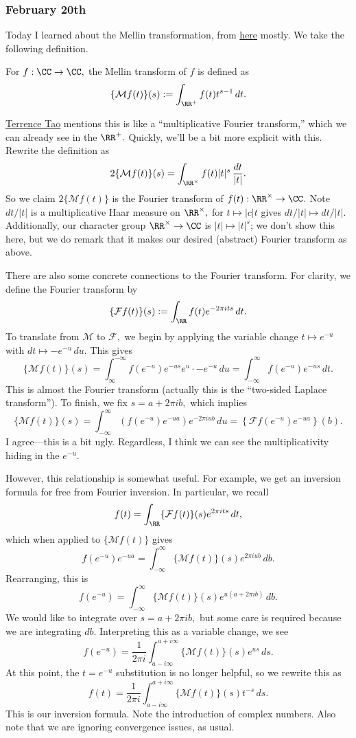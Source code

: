 \subsubsection{February 20th}
Today I learned about the Mellin transformation, from \href{http://dsp-book.narod.ru/TAH/ch11.pdf}{here} mostly. We take the following definition.
\begin{definition}
    For $f:\CC\to\CC,$ the Mellin transform of $f$ is defined as
    \[\{\mathcal Mf(t)\}(s):=\int_{\RR^+}f(t)t^{s-1}\,dt.\]
\end{definition}
\href{https://terrytao.wordpress.com/2008/07/27/tates-proof-of-the-functional-equation/}{Terrence Tao} mentions this is like a ``multiplicative Fourier transform,'' which we can already see in the $\RR^+.$ Quickly, we'll be a bit more explicit with this. Rewrite the definition as
\[2\{\mathcal Mf(t)\}(s)=\int_{\RR^\times}f(t)|t|^s\,\frac{dt}{|t|}.\]
So we claim $2\{\mathcal Mf(t)\}$ is the Fourier transform of $f(t):\RR^\times\to\CC.$ Note $dt/|t|$ is a multiplicative Haar measure on $\RR^\times,$ for $t\mapsto|c|t$ gives $dt/|t|\mapsto dt/|t|.$ Additionally, our character group $\RR^\times\to\CC$ is $|t|\mapsto |t|^s$; we don't show this here, but we do remark that it makes our desired (abstract) Fourier transform as above.

There are also some concrete connections to the Fourier transform. For clarity, we define the Fourier transform by
\[\{\mathcal Ff(t)\}(s):=\int_\RR f(t)e^{-2\pi its}\,dt.\]
To translate from $\mathcal M$ to $\mathcal F,$ we begin by applying the variable change $t\mapsto e^{-u}$ with $dt\mapsto-e^{-u}\,du.$ This gives
\[\{\mathcal Mf(t)\}(s)=\int_\infty^{-\infty}f\left(e^{-u}\right)e^{-us}e^u\cdot-e^{-u}\,du=\int_{-\infty}^\infty f\left(e^{-u}\right)e^{-us}\,dt.\]
This is almost the Fourier transform (actually this is the ``two-sided Laplace transform''). To finish, we fix $s=a+2\pi ib,$ which implies
\[\{\mathcal Mf(t)\}(s)=\int_{-\infty}^\infty\left(f\left(e^{-u}\right)e^{-ua}\right)e^{-2\pi iub}\,du=\left\{\mathcal Ff\left(e^{-u}\right)e^{-ua}\right\}(b).\]
I agree---this is a bit ugly. Regardless, I think we can see the multiplicativity hiding in the $e^{-u}.$

However, this relationship is somewhat useful. For example, we get an inversion formula for free from Fourier inversion. In particular, we recall
\[f(t)=\int_\RR\{\mathcal Ff(t)\}(s)e^{2\pi its}\,dt,\]
which when applied to $\{\mathcal Mf(t)\}$ gives
\[f\left(e^{-u}\right)e^{-ua}=\int_{-\infty}^\infty\{\mathcal Mf(t)\}(s)e^{2\pi iub}\,db.\]
Rearranging, this is
\[f\left(e^{-u}\right)=\int_{-\infty}^\infty\{\mathcal Mf(t)\}(s)e^{u(a+2\pi ib)}\,db.\]
We would like to integrate over $s=a+2\pi ib,$ but some care is required because we are integrating $db.$ Interpreting this as a variable change, we see
\[f\left(e^{-u}\right)=\frac1{2\pi i}\int_{a-i\infty}^{a+i\infty}\{\mathcal Mf(t)\}(s)e^{us}\,ds.\]
At this point, the $t=e^{-u}$ substitution is no longer helpful, so we rewrite this as
\[f(t)=\frac1{2\pi i}\int_{a-i\infty}^{a+i\infty}\{\mathcal Mf(t)\}(s)t^{-s}\,ds.\]
This is our inversion formula. Note the introduction of complex numbers. Also note that we are ignoring convergence issues, as usual.

